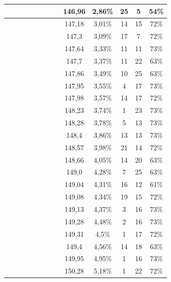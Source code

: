 \begin{center}
\begin{longtable}{|c|c|c|c|c|c|c|c|c|c|c|c|c|}
 \x &  \x &  &  &  &  &  &  \x & 146,96 & 2,86\% & 25 & 5 & 54\% \\ \hline
 \x &  \x &  \x &  &  &  \x &  &  \x & 147,18 & 3,01\% & 14 & 15 & 72\% \\ \hline
 \x &  &  \x &  \x &  &  \x &  &  \x & 147,3 & 3,09\% & 17 & 7 & 72\% \\ \hline
 \x &  &  &  &  &  \x &  \x &  \x & 147,64 & 3,33\% & 11 & 11 & 73\% \\ \hline
 \x &  &  \x &  &  &  &  &  \x & 147,7 & 3,37\% & 11 & 22 & 63\% \\ \hline
 \x &  \x &  \x &  &  &  &  &  \x & 147,86 & 3,49\% & 10 & 25 & 63\% \\ \hline
 \x &  &  &  &  \x &  \x &  \x &  \x & 147,95 & 3,55\% & 4 & 17 & 73\% \\ \hline
 \x &  &  \x &  &  &  \x &  &  \x & 147,98 & 3,57\% & 14 & 17 & 72\% \\ \hline
 \x &  &  &  &  \x &  \x &  \x &  \x & 148,23 & 3,74\% & 1 & 23 & 73\% \\ \hline
 \x &  \x &  &  \x &  &  \x &  \x &  \x & 148,28 & 3,78\% & 5 & 13 & 73\% \\ \hline
 \x &  &  &  \x &  \x &  \x &  \x &  \x & 148,4 & 3,86\% & 13 & 13 & 73\% \\ \hline
 \x &  \x &  &  \x &  &  \x &  &  \x & 148,57 & 3,98\% & 21 & 14 & 72\% \\ \hline
 \x &  \x &  \x &  \x &  &  &  &  \x & 148,66 & 4,05\% & 14 & 20 & 63\% \\ \hline
 \x &  \x &  \x &  \x &  &  &  &  \x & 149,0 & 4,28\% & 7 & 25 & 63\% \\ \hline
 \x &  \x &  &  &  \x &  &  &  \x & 149,04 & 4,31\% & 16 & 12 & 61\% \\ \hline
 \x &  &  &  \x &  &  \x &  &  \x & 149,08 & 4,34\% & 19 & 15 & 72\% \\ \hline
 \x &  &  \x &  &  &  \x &  \x &  \x & 149,13 & 4,37\% & 3 & 16 & 73\% \\ \hline
 \x &  \x &  \x &  &  &  \x &  \x &  \x & 149,28 & 4,48\% & 2 & 16 & 73\% \\ \hline
 \x &  \x &  &  \x &  \x &  \x &  &  \x & 149,31 & 4,5\% & 1 & 17 & 72\% \\ \hline
 \x &  &  \x &  &  \x &  &  &  \x & 149,4 & 4,56\% & 14 & 18 & 63\% \\ \hline
 \x &  \x &  \x &  &  &  \x &  &  \x & 149,95 & 4,95\% & 1 & 16 & 73\% \\ \hline
 \x &  &  \x &  &  \x &  \x &  \x &  \x & 150,28 & 5,18\% & 1 & 22 & 72\% \\ \hline

\end{longtable}
\end{center}
